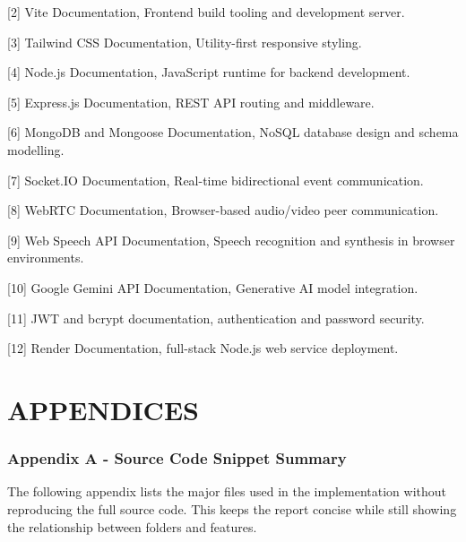 \documentclass[12pt,a4paper]{report}
\begin{document}
[2] Vite Documentation, Frontend build tooling and development server.


[3] Tailwind CSS Documentation, Utility-first responsive styling.


[4] Node.js Documentation, JavaScript runtime for backend development.


[5] Express.js Documentation, REST API routing and middleware.


[6] MongoDB and Mongoose Documentation, NoSQL database design and schema modelling.


[7] Socket.IO Documentation, Real-time bidirectional event communication.


[8] WebRTC Documentation, Browser-based audio/video peer communication.


[9] Web Speech API Documentation, Speech recognition and synthesis in browser environments.


[10] Google Gemini API Documentation, Generative AI model integration.


[11] JWT and bcrypt documentation, authentication and password security.


[12] Render Documentation, full-stack Node.js web service deployment.


\chapter*{APPENDICES}

\subsection{Appendix A - Source Code Snippet Summary}

The following appendix lists the major files used in the implementation without reproducing the full source code. This keeps the report concise while still showing the relationship between folders and features.
\end{document}

